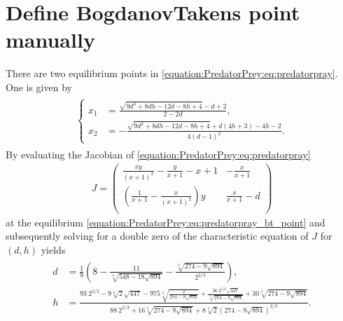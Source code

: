 \documentclass[letterpaper,10pt,english]{jupyterBook}
\begin{document}
\begin{sphinxVerbatim}[commandchars=\\\{\}]
\end{sphinxVerbatim}


\section{Define Bogdanov\sphinxhyphen{}Takens point manually}
\label{\detokenize{PredatorPrey:define-bogdanov-takens-point-manually}}
\sphinxAtStartPar
There are two equilibrium points in \eqref{equation:PredatorPrey:eq:predatorpray}. One is given by
\begin{equation}\label{equation:PredatorPrey:eq:predatorpray_bt_point}
\begin{split}\begin{aligned}
\begin{cases}
x_1 &= \frac{\sqrt{9 d^2+8 d h-12 d-8 h+4}-d+2}{2-2 d}, \\
x_2 &= -\frac{\sqrt{9 d^2+8 d h-12 d-8 h+4}+d (4 h+3)-4 h-2}{4 (d-1)^2}.
\end{cases}
\end{aligned}\end{split}
\end{equation}
\sphinxAtStartPar
By evaluating the Jacobian of \eqref{equation:PredatorPrey:eq:predatorpray}
\begin{equation*}
\begin{split}
J = \begin{pmatrix}
 \frac{x y}{(x+1)^2}-\frac{y}{x+1}-x+1 & -\frac{x}{x+1} \\
 \left(\frac{1}{x+1}-\frac{x}{(x+1)^2}\right) y & \frac{x}{x+1}-d \\
\end{pmatrix}
\end{split}
\end{equation*}
\sphinxAtStartPar
at the equilibrium \eqref{equation:PredatorPrey:eq:predatorpray_bt_point} and subsequently solving for
a double zero of the characteristic equation of \(J\) for \((d,h)\) yields
\begin{equation*}
\begin{split}
\begin{aligned}
d &= \frac{1}{9} \left(8-\frac{11}{\sqrt[3]{548-18 \sqrt{894}}}-\frac{\sqrt[3]{274-9 \sqrt{894}}}{2^{2/3}}\right), \\
h &= \frac{93\ 2^{2/3}-9 \sqrt[6]{2} \sqrt{447}-975 \sqrt[3]{\frac{2}{274-9 \sqrt{894}}}+\frac{36\ 2^{5/6} \sqrt{447}}{\sqrt[3]{274-9 \sqrt{894}}}+30 \sqrt[3]{274-9 \sqrt{894}}}{88\ 2^{2/3}+16 \sqrt[3]{274-9 \sqrt{894}}+8 \sqrt[3]{2} \left(274-9 \sqrt{894}\right)^{2/3}}
.
\end{aligned}
\end{split}
\end{equation*}
\end{document}
